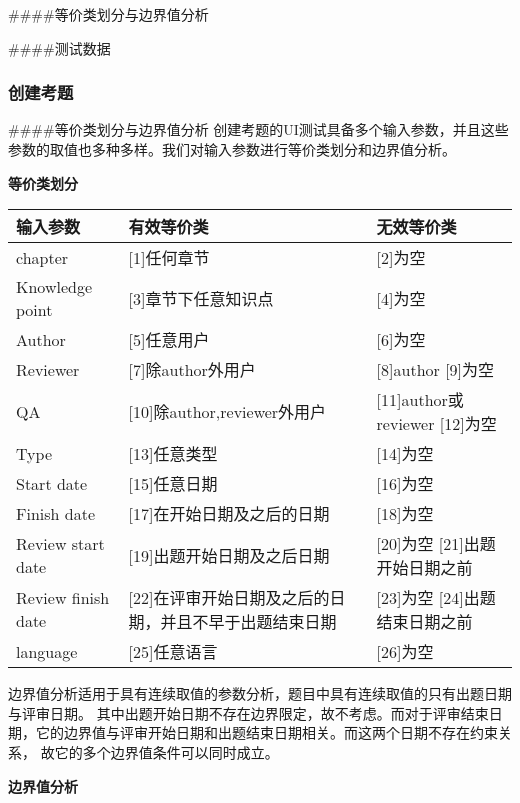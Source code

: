 \documentclass[hyperref, a4paper]{ctexart}
\begin{document}
\#\#\#\#等价类划分与边界值分析

\#\#\#\#测试数据

\hypertarget{ux521bux5efaux8003ux9898-1}{%
\subsubsection{创建考题}\label{ux521bux5efaux8003ux9898-1}}

\#\#\#\#等价类划分与边界值分析
创建考题的UI测试具备多个输入参数，并且这些参数的取值也多种多样。我们对输入参数进行等价类划分和边界值分析。

\textbf{等价类划分}

\begin{longtable}[]{@{}lll@{}}
\toprule
输入参数 & 有效等价类 & 无效等价类\tabularnewline
\midrule
\endhead
chapter & {[}1{]}任何章节 & {[}2{]}为空\tabularnewline
Knowledge point & {[}3{]}章节下任意知识点 & {[}4{]}为空\tabularnewline
Author & {[}5{]}任意用户 & {[}6{]}为空\tabularnewline
Reviewer & {[}7{]}除author外用户 & {[}8{]}author
{[}9{]}为空\tabularnewline
QA & {[}10{]}除author,reviewer外用户 & {[}11{]}author或reviewer
{[}12{]}为空\tabularnewline
Type & {[}13{]}任意类型 & {[}14{]}为空\tabularnewline
Start date & {[}15{]}任意日期 & {[}16{]}为空\tabularnewline
Finish date & {[}17{]}在开始日期及之后的日期 &
{[}18{]}为空\tabularnewline
Review start date & {[}19{]}出题开始日期及之后日期 & {[}20{]}为空
{[}21{]}出题开始日期之前\tabularnewline
Review finish date &
{[}22{]}在评审开始日期及之后的日期，并且不早于出题结束日期 &
{[}23{]}为空 {[}24{]}出题结束日期之前\tabularnewline
language & {[}25{]}任意语言 & {[}26{]}为空\tabularnewline
\bottomrule
\end{longtable}

边界值分析适用于具有连续取值的参数分析，题目中具有连续取值的只有出题日期与评审日期。
其中出题开始日期不存在边界限定，故不考虑。而对于评审结束日期，它的边界值与评审开始日期和出题结束日期相关。而这两个日期不存在约束关系，
故它的多个边界值条件可以同时成立。

\textbf{边界值分析}
\end{document}
